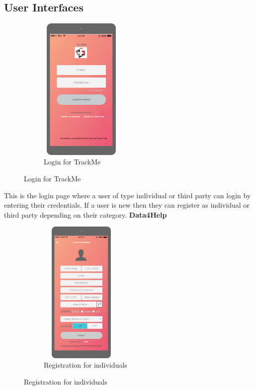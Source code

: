\subsection{User Interfaces}
\begin{figure}[H]
	\centering
	\begin{subfigure}[b]{0.4\textwidth}	
		\includegraphics[width=4cm,height=7cm]		{./RASD_Mockups/1_Login.png}
      	\caption{Login for TrackMe}
        \label{TrackMe_login}
	 \end{subfigure}
\end{figure}
This is the login page where a user of type individual or third party can login by entering their credentials. If a user is new then they can register as individual or third party depending on their category.
\newline\newline\newline\newline
\textbf{Data4Help}
\newline{}

\begin{figure}[H]
	\centering
	\begin{subfigure}[b]{0.4\textwidth}	
		\includegraphics[width=4cm,height=7cm]		{./RASD_Mockups/2_I-Register.jpeg}
      	\caption{Registration for individuals}
        \label{TrackMe_register1}
	 \end{subfigure}
\end{figure}


